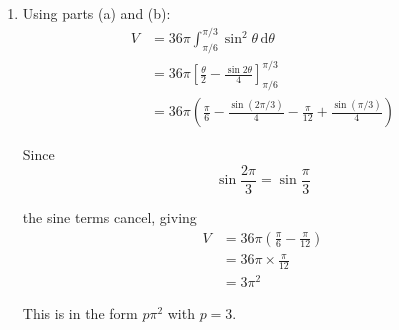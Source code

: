 \documentclass[leqno]{article}
\begin{document}
\begin{enumerate}[
  label=\textbf{\arabic*.},
  leftmargin=*,
  topsep=0pt,
  partopsep=0pt,
  parsep=0pt
]
\begin{djsSolution}
\begin{enumerate}[label=\textbf{(\alph*)}]
  so $\theta=\frac{\pi}{6}$.

  When $y=\frac{1}{\sqrt3}$:
  \[
  \cot\theta=\frac{1}{\sqrt3}\quad\Longrightarrow\quad\tan\theta=\sqrt3
  \]

  so $\theta=\frac{\pi}{3}$.

  Using the parameter $\theta$:
  \[
  V=\pi\int_{\pi/3}^{\pi/6} x^2\frac{\mathrm{d}y}{\mathrm{d}\theta}\,\mathrm{d}\theta
  \]

  so
  \begin{align*}
  V
  &=\pi\int_{\pi/3}^{\pi/6} (6\sin^2\theta)^2\frac{\mathrm{d}y}{\mathrm{d}\theta}\,\mathrm{d}\theta \\
  &=\pi\int_{\pi/3}^{\pi/6} (6\sin^2\theta)^2(-\operatorname{cosec}^2\theta)\,\mathrm{d}\theta \\
  &=36\pi\int_{\pi/3}^{\pi/6} -\sin^2\theta\,\mathrm{d}\theta \\
  &=36\pi\int_{\pi/6}^{\pi/3} \sin^2\theta\,\mathrm{d}\theta
  \end{align*}

  So the required form is
  \[
  k\int_a^b \sin^2\theta\,\mathrm{d}\theta
  \]

  with
  \[
  k=36\pi,\qquad a=\frac{\pi}{6},\qquad b=\frac{\pi}{3}
  \]

  \item Using parts (a) and (b):
  \begin{align*}
  V
  &=36\pi\int_{\pi/6}^{\pi/3}\sin^2\theta\,\mathrm{d}\theta \\
  &=36\pi\left[\frac{\theta}{2}-\frac{\sin 2\theta}{4}\right]_{\pi/6}^{\pi/3} \\
  &=36\pi\left(\frac{\pi}{6}-\frac{\sin(2\pi/3)}{4}-\frac{\pi}{12}+\frac{\sin(\pi/3)}{4}\right)
  \end{align*}

  Since
  \[
  \sin\frac{2\pi}{3}=\sin\frac{\pi}{3}
  \]

  the sine terms cancel, giving
  \begin{align*}
  V
  &=36\pi\left(\frac{\pi}{6}-\frac{\pi}{12}\right) \\
  &=36\pi\times\frac{\pi}{12} \\
  &=3\pi^2
  \end{align*}

  This is in the form $p\pi^2$ with $p=3$.
\end{enumerate}
\end{djsSolution}


\newpage

\questionitem


\end{enumerate}
\end{document}
